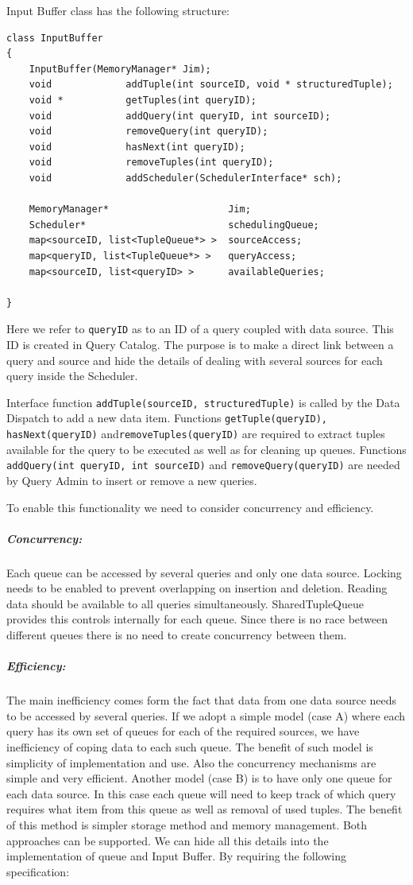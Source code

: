 \documentclass[11pt]{article}
\begin{document}
Input Buffer class has the following structure:

\begin{verbatim}
class InputBuffer
{
	InputBuffer(MemoryManager* Jim);
    void             addTuple(int sourceID, void * structuredTuple);
    void *           getTuples(int queryID);
    void             addQuery(int queryID, int sourceID);
    void             removeQuery(int queryID);
    void             hasNext(int queryID);
    void             removeTuples(int queryID);
    void             addScheduler(SchedulerInterface* sch);

	MemoryManager*                     Jim;
	Scheduler*                         schedulingQueue;
	map<sourceID, list<TupleQueue*> >  sourceAccess;
	map<queryID, list<TupleQueue*> >   queryAccess;
	map<sourceID, list<queryID> >      availableQueries;
	
}
\end{verbatim}

\noindent Here we refer to {\tt queryID} as to an ID of a query coupled with data source. This ID is created in Query Catalog. The purpose is to make a direct link between a query and source and hide the details of dealing with several sources for each query inside the Scheduler.

Interface function {\tt addTuple(sourceID, structuredTuple)} is called by the Data Dispatch to add a new data item. Functions {\tt getTuple(queryID), hasNext(queryID)} and{\tt removeTuples(queryID)} are required to extract tuples available for the query to be executed as well as for cleaning up queues. Functions {\tt addQuery(int queryID, int sourceID)} and {\tt removeQuery(queryID)} are needed by Query Admin to insert or remove a new queries. 

To enable this functionality we need to consider concurrency and efficiency. 

\subparagraph{Concurrency:} Each queue can be accessed by several queries and only one data source. Locking needs to be enabled to prevent overlapping on insertion and deletion. Reading data should be available to all queries simultaneously. SharedTupleQueue provides this controls internally for each queue. Since there is no race between different queues there is no need to create concurrency between them.

\subparagraph{Efficiency:} The main inefficiency comes form the fact that data from one data source needs to be accessed by several queries. If we adopt a simple model (case A) where each query has its own set of queues for each of the required sources, we have inefficiency of coping data to each such queue. The benefit of such model is simplicity of implementation and use. Also the concurrency mechanisms are simple and very efficient. Another model (case B) is to have only one queue for each data source. In this case each queue will need to keep track of which query requires what item from this queue as well as removal of used tuples. The benefit of this method is simpler storage method and memory management. Both approaches can be supported. We can hide all this details into the implementation of queue and Input Buffer. By requiring the following specification:
\end{document}
